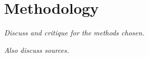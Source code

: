 

\section{Methodology}\label{sec:disc:method}

\textit{Discuss and critique for the methods chosen.}

\textit{Also discuss sources.}

